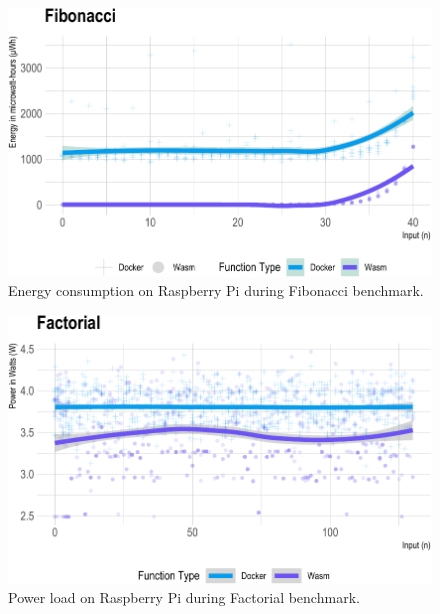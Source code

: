 \documentclass[
  table]{report}
\begin{document}
\begin{figure}[H]

{\centering \includegraphics{thesis_files/figure-latex/fib-energy-1} 

}

\caption{Energy consumption on Raspberry Pi during Fibonacci benchmark.}\label{fig:fib-energy}
\end{figure}

\newpage

\begin{figure}[H]

{\centering \includegraphics{thesis_files/figure-latex/fact-power-1} 

}

\caption{Power load on Raspberry Pi during Factorial benchmark.}\label{fig:fact-power}
\end{figure}
\end{document}
